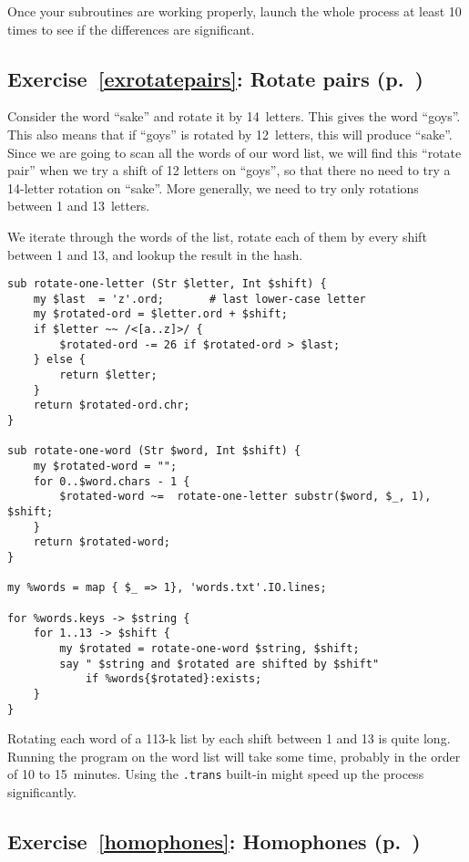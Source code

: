 {Once your subroutines are working properly, launch the 
whole process at least 10 times to see if the differences 
are significant.

\subsection{Exercise~\ref{exrotatepairs}: Rotate pairs (p.~\pageref{exrotatepairs})}
\label{sol_exrotatepairs}

Consider the word ``sake'' and rotate it by 14~letters. This gives the word ``goys''. This also means that if ``goys'' 
is rotated by 12~letters, this will produce ``sake''. Since 
we are going to scan all the words of our word list, we will 
find this ``rotate pair'' when we try a shift of 12 letters 
on ``goys'', so that there no need to try a 14-letter rotation 
on ``sake''. More generally, we need to try only rotations 
between 1 and 13~letters. 

We iterate through the words of the list, rotate each of 
them by every shift between 1 and 13, and lookup the result 
in the hash.

\begin{verbatim}
sub rotate-one-letter (Str $letter, Int $shift) {
    my $last  = 'z'.ord;       # last lower-case letter
    my $rotated-ord = $letter.ord + $shift;
    if $letter ~~ /<[a..z]>/ { 
        $rotated-ord -= 26 if $rotated-ord > $last;
    } else {
        return $letter;
    }
    return $rotated-ord.chr;
}

sub rotate-one-word (Str $word, Int $shift) {
    my $rotated-word = "";
    for 0..$word.chars - 1 {
        $rotated-word ~=  rotate-one-letter substr($word, $_, 1), $shift;
    }
    return $rotated-word;
}

my %words = map { $_ => 1}, 'words.txt'.IO.lines;

for %words.keys -> $string {
    for 1..13 -> $shift {
        my $rotated = rotate-one-word $string, $shift;
        say " $string and $rotated are shifted by $shift"
            if %words{$rotated}:exists;
    }
}
\end{verbatim}

Rotating each word of a 113-k list by each shift between 
1 and 13 is quite long. Running the program on the word list 
will take some time, probably in the order of 10 to 15~minutes.
Using the \verb'.trans' built-in might speed up the process 
significantly.

\subsection{Exercise~\ref{homophones}: Homophones (p.~\pageref{homophones})}
\label{sol_homophones}

}
